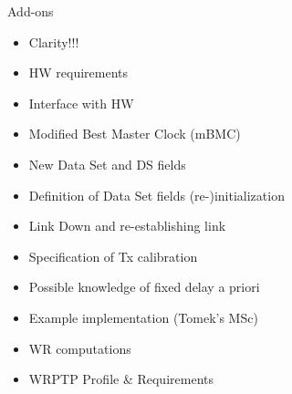 \documentclass[compress,red]{beamer}
\begin{document}
\begin{frame}{Add-ons }


   \begin{itemize}
	\item Clarity!!!
	\item HW requirements
	\item Interface with HW
	\item Modified Best Master Clock (mBMC)
	\item New Data Set and DS fields
	\item Definition of Data Set fields (re-)initialization
	\item Link Down	and re-establishing link		
	\item Specification of Tx calibration
	\item Possible knowledge of fixed delay a priori					%
	\item Example implementation (Tomek's MSc)
	\item WR computations
	\item WRPTP Profile \& Requirements



   \end{itemize}

\end{frame}
\end{document}

